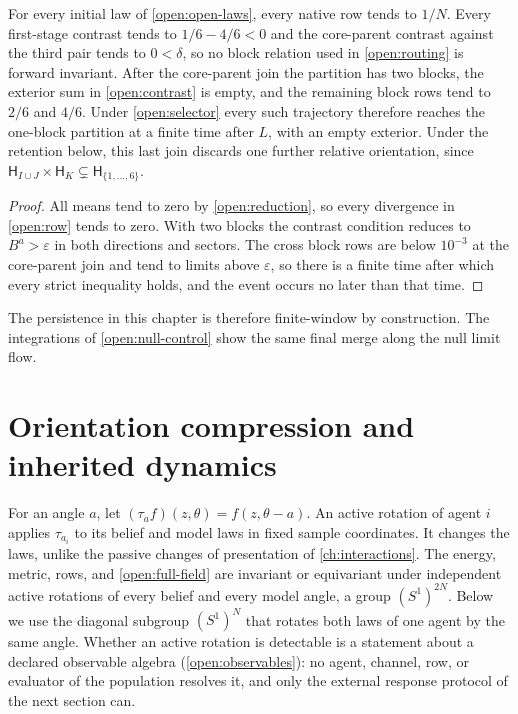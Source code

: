 For every initial law of \cref{open:open-laws}, every native row tends to $1/N$. Every first-stage contrast tends to $1/6-4/6<0$ and the core-parent contrast against the third pair tends to $0<\delta$, so no block relation used in \cref{open:routing} is forward invariant. After the core-parent join the partition has two blocks, the exterior sum in \cref{open:contrast} is empty, and the remaining block rows tend to $2/6$ and $4/6$. Under \cref{open:selector} every such trajectory therefore reaches the one-block partition at a finite time after $L$, with an empty exterior. Under the retention below, this last join discards one further relative orientation, since $\mathsf H_{I\cup J}\times\mathsf H_K\subsetneq\mathsf H_{\{1,\ldots,6\}}$.
\begin{proof}
All means tend to zero by \cref{open:reduction}, so every divergence in \cref{open:row} tends to zero. With two blocks the contrast condition reduces to $B^a>\varepsilon$ in both directions and sectors. The cross block rows are below $10^{-3}$ at the core-parent join and tend to limits above $\varepsilon$, so there is a finite time after which every strict inequality holds, and the event occurs no later than that time.
\end{proof}

The persistence in this chapter is therefore finite-window by construction. The integrations of \cref{open:null-control} show the same final merge along the null limit flow.

\section{Orientation compression and inherited dynamics}

For an angle $a$, let $(\tau_af)(z,\theta)=f(z,\theta-a)$. An active rotation of agent $i$ applies $\tau_{a_i}$ to its belief and model laws in fixed sample coordinates. It changes the laws, unlike the passive changes of presentation of \cref{ch:interactions}. The energy, metric, rows, and \cref{open:full-field} are invariant or equivariant under independent active rotations of every belief and every model angle, a group $(S^1)^{2N}$. Below we use the diagonal subgroup $(S^1)^N$ that rotates both laws of one agent by the same angle. Whether an active rotation is detectable is a statement about a declared observable algebra (\cref{open:observables}): no agent, channel, row, or evaluator of the population resolves it, and only the external response protocol of the next section can.

